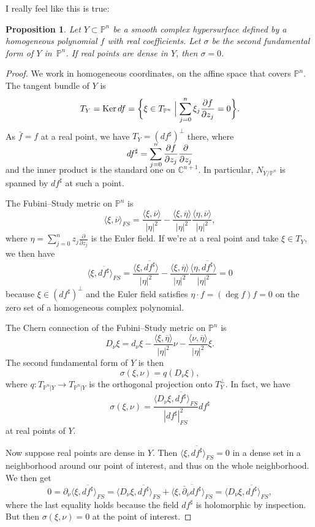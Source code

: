 \documentclass[11pt]{article}
\newtheorem{prop}[theo]{Proposition}
\theoremstyle{definition}
\newcommand{\kk}[1]{\mathbb{#1}}
\def\ov#1{\overline{#1}}
\DeclareMathOperator{\Ker}{Ker}
\begin{document}
I really feel like this is true:


\begin{prop}
Let $Y \subset \kk P^{n}$ be a smooth complex hypersurface defined by a homogeneous polynomial  $f$ with real coefficients.
Let $\sigma$ be the second fundamental form of $Y$ in~$\kk P^{n}$.
If real points are dense in $Y$, then $\sigma = 0$.
\end{prop}

\begin{proof}
We work in homogeneous coordinates, on the affine space that covers $\kk P^{n}$.
The tangent bundle of $Y$ is
\[
  T_{Y} = \Ker df
  = \biggl\{
  \xi \in T_{\kk P^{n}}
  \Bigm| \sum_{j=0}^{n} \xi_{j} \frac{\partial f}{\partial z_{j}} = 0
  \biggr\}.
\]
As $\bar f = f$ at a real point, we have $T_{Y} = (df^{\sharp})^{\perp}$ there,
where
$$
df^{\sharp} =
\smash{\sum_{j=0}^{n} \frac{\partial f}{\partial z_{j}} \frac{\partial}{\partial z_{j}}}
$$
and the inner product is the standard one on $\kk C^{n+1}$.
In particular, $N_{Y/\kk P^{n}}$ is spanned by $df^{\sharp}$ at such a point.

The Fubini--Study metric on $\kk P^{n}$ is
\[
  \langle \xi, \ov\nu \rangle_{FS}
  = \frac{\langle \xi, \ov\nu \rangle}{|\eta|^{2}}
  - \frac{\langle \xi, \ov\eta \rangle}{|\eta|^{2}}
  \frac{\langle \eta, \ov\nu \rangle}{|\eta|^{2}},
\]
where $\eta = \sum_{j=0}^{n} z_{j} \frac{\partial}{\partial z_{j}}$ is the Euler field.
If we're at a real point and take $\xi \in T_{Y}$, we then have
\[
  \langle \xi, \ov{df^{\sharp}} \rangle_{FS}
  = \frac{\langle \xi, \ov{df^{\sharp}} \rangle}{|\eta|^{2}}
  - \frac{\langle \xi, \ov\eta \rangle}{|\eta|^{2}}
  \frac{\langle \eta, \ov{df^{\sharp}} \rangle}{|\eta|^{2}}
  = 0
\]
because $\xi \in (df^{\sharp})^{\perp}$ and the Euler field satisfies $\eta \cdot f = (\deg f) f = 0$ on the zero set of a homogeneous complex polynomial.

The Chern connection of the Fubini--Study metric on $\kk P^{n}$ is
\[
  D_{\nu} \xi = d_{\nu}\xi
  - \frac{\langle \xi, \ov\eta\rangle}{|\eta|^{2}} \nu
  - \frac{\langle \nu, \ov\eta\rangle}{|\eta|^{2}} \xi.
\]
The second fundamental form of $Y$ is then
\[
  \sigma(\xi, \nu)
  = q(D_{\nu}\xi),
\]
where $q : T_{\kk P^{n}|Y} \to T_{\kk P^{n}|Y}$ is the orthogonal projection onto $T_{Y}^{\perp}$.
In fact, we have
\[
  \sigma(\xi, \nu)
  = \frac{\langle D_{\nu} \xi, \ov{df^{\sharp}} \rangle_{FS}}{|df^{\sharp}|_{FS}^{2}} df^{\sharp}
\]
at real points of $Y$.

Now suppose real points are dense in $Y$.
Then $\langle \xi, \ov{df^{\sharp}} \rangle_{FS} = 0$ in a dense set in a neighborhood around our point of interest, and thus on the whole neighborhood.
We then get
\[
  0 = \partial_{\nu} \langle \xi, \ov{df^{\sharp}} \rangle_{FS}
  = \langle D_{\nu}\xi,  \ov{df^{\sharp}} \rangle_{FS}
  + \langle \xi,  \ov{\bar\partial_{\ov\nu}df^{\sharp}} \rangle_{FS}
  = \langle D_{\nu}\xi,  \ov{df^{\sharp}} \rangle_{FS},
\]
where the last equality holds because the field $df^{\sharp}$ is holomorphic by inspection.
But then $\sigma(\xi, \nu) = 0$ at the point of interest.
\end{proof}
\end{document}
